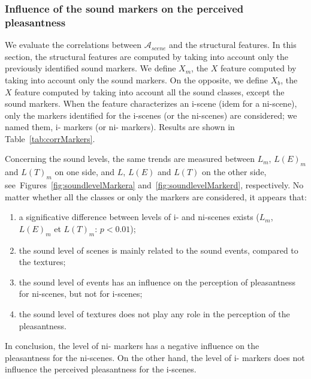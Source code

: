 \documentclass[preprint,12pt]{elsarticle}
\newcommand{\cf}{cf.}
\begin{document}
\subsubsection*{Influence of the sound markers on the perceived pleasantness}

We evaluate the correlations between $\mathcal{A}_{scene}$ and the structural features. In this section, the structural features are computed by taking into account only the previously identified sound markers. We define $X_m$, the $X$ feature computed by taking into account only the sound markers. On the opposite, we define $X_b$, the $X$ feature computed by taking into account all the sound classes, except the sound markers. When the feature characterizes an i-scene (idem for a ni-scene),  only the markers identified for the i-scenes (or the ni-scenes) are considered; we named them, i- markers (or ni- markers). Results are shown in Table~\ref{tab:corrMarkers}.

Concerning the sound levels, the same trends are measured between $L_m$, $L(E)_m$ and $L(T)_m$ on one side, and $L$, $L(E)$ and $L(T)$ on the other side, see~Figures~\ref{fig:soundlevelMarkera} and~\ref{fig:soundlevelMarkerd}, respectively. No matter whether all the classes or only the markers are considered, it appears that:

\begin{enumerate}
\item a significative difference between levels of i- and ni-scenes exists ($L_m$, $L(E)_m$ et $L(T)_m$: $p<0.01$);
\item the sound level of scenes is mainly related to the sound events, compared to the textures;
\item the sound level of events has an influence on the perception of pleasantness for ni-scenes, but not for i-scenes;
\item the sound level of textures does not play any role in the perception of the pleasantness.
\end{enumerate}

In conclusion, the level of ni- markers has a negative influence on the pleasantness for the ni-scenes. On the other hand, the level of i- markers does not influence the perceived pleasantness for the i-scenes.

\end{document}
